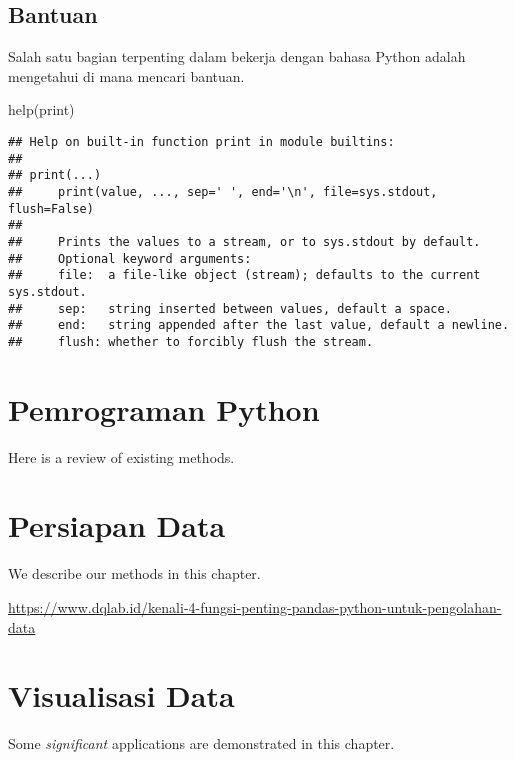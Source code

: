 \documentclass[
]{docs}
\newenvironment{Shaded}{\begin{snugshade}}{\end{snugshade}}
\newcommand{\BuiltInTok}[1]{#1}
\newcommand{\NormalTok}[1]{#1}
\begin{document}
\hypertarget{bantuan}{%
\subsection{Bantuan}\label{bantuan}}

Salah satu bagian terpenting dalam bekerja dengan bahasa Python adalah mengetahui di mana mencari bantuan.

\begin{Shaded}
\begin{Highlighting}[]
\BuiltInTok{help}\NormalTok{(}\BuiltInTok{print}\NormalTok{)}
\end{Highlighting}
\end{Shaded}

\begin{verbatim}
## Help on built-in function print in module builtins:
## 
## print(...)
##     print(value, ..., sep=' ', end='\n', file=sys.stdout, flush=False)
##     
##     Prints the values to a stream, or to sys.stdout by default.
##     Optional keyword arguments:
##     file:  a file-like object (stream); defaults to the current sys.stdout.
##     sep:   string inserted between values, default a space.
##     end:   string appended after the last value, default a newline.
##     flush: whether to forcibly flush the stream.
\end{verbatim}

\hypertarget{pemrograman-python}{%
\section{Pemrograman Python}\label{pemrograman-python}}

Here is a review of existing methods.

\hypertarget{persiapan-data}{%
\section{Persiapan Data}\label{persiapan-data}}

We describe our methods in this chapter.

\url{https://www.dqlab.id/kenali-4-fungsi-penting-pandas-python-untuk-pengolahan-data}

\hypertarget{visualisasi-data}{%
\section{Visualisasi Data}\label{visualisasi-data}}

Some \emph{significant} applications are demonstrated in this chapter.
\end{document}
